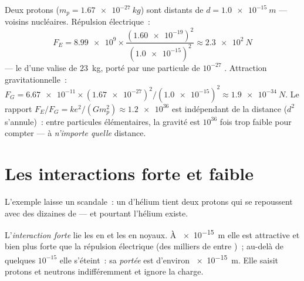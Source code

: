\begin{example}\label{ex:g11:fundamental-interactions:protons}
Deux protons ($m_p = \qty{1.67e-27}{kg}$) sont distants de
$d = \qty{1.0e-15}{m}$ --- voisins nucléaires. Répulsion électrique~:
\[
F_E = \num{8.99e9} \times
\frac{(\num{1.60e-19})^{2}}{(\num{1.0e-15})^{2}}
\approx \qty{2.3e2}{N}
\]
--- le  d'une valise de $23$~kg, porté
par une particule de $10^{-27}$
. Attraction gravitationnelle~:
$F_G = \num{6.67e-11} \times (\num{1.67e-27})^{2} /
(\num{1.0e-15})^{2} \approx \qty{1.9e-34}{N}$. Le rapport
$F_E / F_G = k e^{2} / (G m_p^{2}) \approx \num{1.2e36}$ est
indépendant de la distance ($d^{2}$ s'annule)~: entre particules
élémentaires, la gravité est $10^{36}$ fois trop faible pour compter ---
à \emph{n'importe quelle} distance.
\end{example}

\section{Les interactions forte et faible}

L'exemple laisse un scandale~: un
 d'hélium tient deux protons qui se
repoussent avec des dizaines de  --- et
pourtant l'hélium existe.

\begin{definition}\label{def:g11:fundamental-interactions:strong}
L'\emph{interaction forte} lie les
 en
 et les
 en noyaux. À \qty{e-15}{m} elle
est attractive et bien plus forte que la répulsion électrique (des
milliers de  entre
)~; au-delà de quelques $10^{-15}$
 elle s'éteint~: sa
\emph{portée} est d'environ
\qty{e-15}{m}. Elle saisit protons et neutrons indifféremment et ignore
la charge.
\end{definition}

